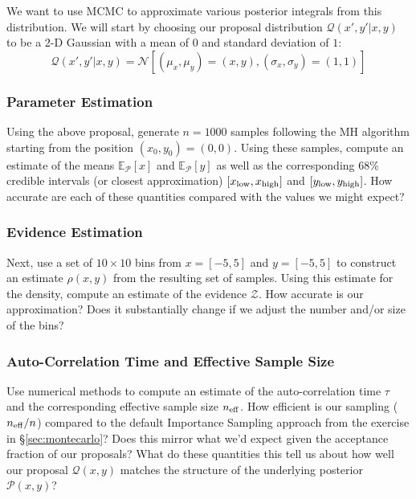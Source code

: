 \documentclass[12pt, titlepage]{article}
\newcommand{\Normal}[2]{\ensuremath{\mathcal{N}\left[{#1}, {#2} \right]}} %
\newcommand{\meanwrt}[2]{\ensuremath{\mathbb{E}_{{#2}}\left[{#1}\right]}}
\newcommand{\posterior}{\ensuremath{\mathcal{P}}}
\newcommand{\proposal}{\ensuremath{\mathcal{Q}}}
\newcommand{\evidence}{\ensuremath{\mathcal{Z}}}
\begin{document}
We want to use MCMC to approximate various posterior
integrals from this distribution.
We will start by choosing our proposal distribution $\proposal(x',y'|x,y)$
to be a 2-D Gaussian with a mean of $0$ and standard deviation of $1$:
\begin{equation*}
    \proposal(x',y'|x,y) = \Normal{(\mu_x,\mu_y)=(x,y)}{(\sigma_x,\sigma_y)=(1,1)}
\end{equation*}

\subsubsection*{Parameter Estimation}

Using the above proposal, generate $n=1000$ samples following the MH algorithm starting
from the position $(x_0,y_0)=(0,0)$. Using these samples,
compute an estimate of the means $\meanwrt{x}{\posterior}$
and $\meanwrt{y}{\posterior}$ as well as the corresponding 68\% credible
intervals (or closest approximation)
$[x_{\rm low}, x_{\rm high}]$ and $[y_{\rm low}, y_{\rm high}]$.
How accurate are each of these quantities compared with the values we might
expect?

\subsubsection*{Evidence Estimation}

Next, use a set of $10 \times 10$ bins from
$x=[-5, 5]$ and $y=[-5, 5]$ to construct an estimate $\rho(x,y)$ 
from the resulting set of samples. Using this estimate
for the density, compute an estimate of the evidence $\evidence$.
How accurate is our approximation? Does it substantially
change if we adjust the number and/or size of the bins?

\subsubsection*{Auto-Correlation Time and Effective Sample Size}

Use numerical methods to compute an estimate of the
auto-correlation time $\tau$ and the corresponding effective sample size $n_{\rm eff}$.
How efficient is our sampling ($n_{\rm eff}/n$) compared to the default
Importance Sampling approach from the exercise in \S\ref{sec:montecarlo}?
Does this mirror what we'd expect given the acceptance fraction of our proposals?
What do these quantities this tell us about how well 
our proposal $\proposal(x,y)$ matches the structure of the underlying posterior
$\posterior(x,y)$?
\end{document}
